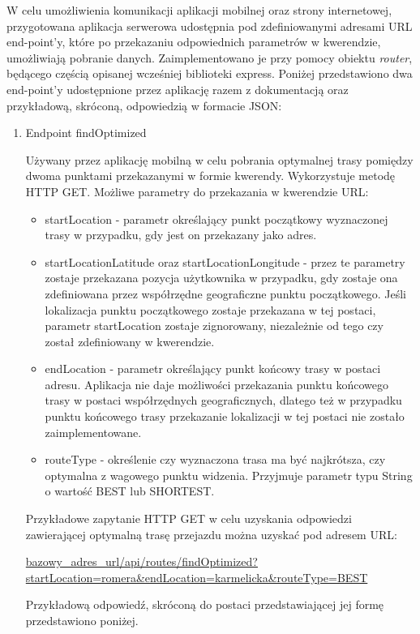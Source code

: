 W celu umożliwienia komunikacji aplikacji mobilnej oraz strony internetowej, przygotowana aplikacja serwerowa udostępnia pod zdefiniowanymi adresami URL end-point’y, które po przekazaniu odpowiednich parametrów w kwerendzie, umożliwiają pobranie danych. Zaimplementowano je przy pomocy obiektu \textit{router}, będącego częścią opisanej wcześniej biblioteki express.
Poniżej przedstawiono dwa end-point’y udostępnione przez aplikację razem z dokumentacją oraz przykładową, skróconą, odpowiedzią w formacie JSON:
\begin{enumerate}
\item Endpoint findOptimized

Używany przez aplikację mobilną w celu pobrania optymalnej trasy pomiędzy dwoma punktami przekazanymi w formie kwerendy. Wykorzystuje metodę HTTP GET. Możliwe parametry do przekazania w kwerendzie URL:

\begin{itemize}
\item startLocation - parametr określający punkt początkowy wyznaczonej trasy w przypadku, gdy jest on przekazany jako adres.
\item startLocationLatitude oraz startLocationLongitude - przez te parametry zostaje przekazana pozycja użytkownika w przypadku, gdy zostaje ona zdefiniowana przez współrzędne geograficzne punktu początkowego. Jeśli lokalizacja punktu początkowego zostaje przekazana w tej postaci, parametr startLocation zostaje zignorowany, niezależnie od tego czy został zdefiniowany w kwerendzie.
\item endLocation - parametr określający punkt końcowy trasy w postaci adresu. Aplikacja nie daje możliwości przekazania punktu końcowego trasy w postaci współrzędnych geograficznych, dlatego też w przypadku punktu końcowego trasy przekazanie lokalizacji w tej postaci nie zostało zaimplementowane.
\item routeType - określenie czy wyznaczona trasa ma być najkrótsza, czy optymalna z wagowego punktu widzenia. Przyjmuje parametr typu String o wartość BEST lub SHORTEST.
\end{itemize}

Przykładowe zapytanie HTTP GET w celu uzyskania odpowiedzi zawierającej optymalną trasę przejazdu można uzyskać pod adresem URL:

\url{bazowy_adres_url/api/routes/findOptimized?startLocation=romera&endLocation=karmelicka&routeType=BEST}

Przykładową odpowiedź, skróconą do postaci przedstawiającej jej formę przedstawiono poniżej.


\end{enumerate}
